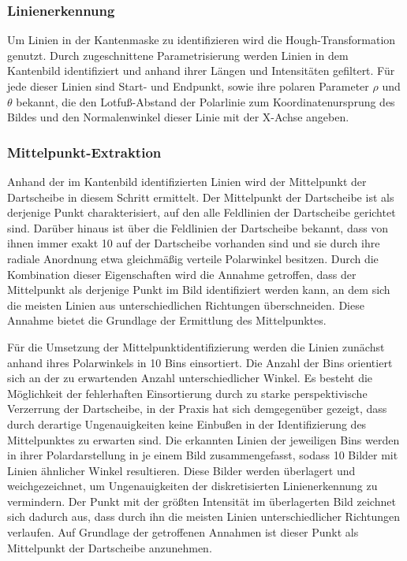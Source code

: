 \subsubsection{Linienerkennung}
\label{sec:impl:cv:lines:erkennung}

Um Linien in der Kantenmaske zu identifizieren wird die Hough-Transformation genutzt. Durch zugeschnittene Parametrisierung werden Linien in dem Kantenbild identifiziert und anhand ihrer Längen und Intensitäten gefiltert. Für jede dieser Linien sind Start- und Endpunkt, sowie ihre polaren Parameter $\rho$ und $\theta$ bekannt, die den Lotfuß-Abstand der Polarlinie zum Koordinatenursprung des Bildes und den Normalenwinkel dieser Linie mit der X-Achse angeben.

\subsubsection{Mittelpunkt-Extraktion}
\label{sec:impl:cv:lines:midpoint}

Anhand der im Kantenbild identifizierten Linien wird der Mittelpunkt der Dartscheibe in diesem Schritt ermittelt. Der Mittelpunkt der Dartscheibe ist als derjenige Punkt charakterisiert, auf den alle Feldlinien der Dartscheibe gerichtet sind. Darüber hinaus ist über die Feldlinien der Dartscheibe bekannt, dass von ihnen immer exakt 10 auf der Dartscheibe vorhanden sind und sie durch ihre radiale Anordnung etwa gleichmäßig verteile Polarwinkel besitzen. Durch die Kombination dieser Eigenschaften wird die Annahme getroffen, dass der Mittelpunkt als derjenige Punkt im Bild identifiziert werden kann, an dem sich die meisten Linien aus unterschiedlichen Richtungen überschneiden. Diese Annahme bietet die Grundlage der Ermittlung des Mittelpunktes.

Für die Umsetzung der Mittelpunktidentifizierung werden die Linien zunächst anhand ihres Polarwinkels in 10 Bins einsortiert. Die Anzahl der Bins orientiert sich an der zu erwartenden Anzahl unterschiedlicher Winkel. Es besteht die Möglichkeit der fehlerhaften Einsortierung durch zu starke perspektivische Verzerrung der Dartscheibe, in der Praxis hat sich demgegenüber gezeigt, dass durch derartige Ungenauigkeiten keine Einbußen in der Identifizierung des Mittelpunktes zu erwarten sind. Die erkannten Linien der jeweiligen Bins werden in ihrer Polardarstellung in je einem Bild zusammengefasst, sodass 10 Bilder mit Linien ähnlicher Winkel resultieren. Diese Bilder werden überlagert und weichgezeichnet, um Ungenauigkeiten der diskretisierten Linienerkennung zu vermindern. Der Punkt mit der größten Intensität im überlagerten Bild zeichnet sich dadurch aus, dass durch ihn die meisten Linien unterschiedlicher Richtungen verlaufen. Auf Grundlage der getroffenen Annahmen ist dieser Punkt als Mittelpunkt der Dartscheibe anzunehmen.

